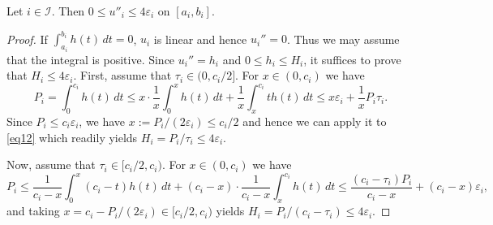 \documentclass[10pt,a4paper]{amsart}
\newcommand{\eps}{\varepsilon}
\begin{document}
\begin{lemma}
\label{T5}
Let $i\in\mathcal{I}$. Then $0\leq u''_i\leq 4\eps_i$ on $[a_i,b_i]$.
\end{lemma}

\begin{proof}
If $\int_{a_i}^{b_i} h(t)\, dt=0$, $u_i$ is linear and hence $u_i''=0$. Thus we may assume that the integral is positive. Since $u_i''=h_i$ and $0\leq h_i\leq H_i$, it suffices to prove that $H_i\leq 4\eps_i$.
First, assume that $\tau_i\in (0,c_i/2]$. For $x\in (0,c_i)$ we have
\begin{equation}
\label{eq12}
P_i=\int_0^{c_i} h(t)\, dt\leq
x\cdot\frac{1}{x}\int_0^x h(t)\, dt + \frac{1}{x}\int_x^{c_i} th(t)\, dt\leq
x\eps_i+\frac{1}{x}P_i\tau_i.
\end{equation}
Since $P_i\leq c_i\eps_i$, we have $x:=P_i/(2\eps_i)\leq c_i/2$ and hence we can apply it to \eqref{eq12} which readily yields $H_i=P_i/\tau_i\leq 4\eps_i$.

Now, assume that $\tau_i\in [c_i/2,c_i)$. For $x\in (0,c_i)$ we have
$$
P_i\leq\frac{1}{c_i-x}\int_0^x(c_i-t) h(t)\, dt+(c_i-x)\cdot\frac{1}{c_i-x}\int_x^{c_i} h(t)\, dt\leq
\frac{(c_i-\tau_i)P_i}{c_i-x} +(c_i-x)\eps_i,
$$
and taking $x=c_i-P_i/(2\eps_i)\in [c_i/2,c_i)$ yields $H_i=P_i/(c_i-\tau_i)\leq 4\eps_i$.
\end{proof}
\end{document}
